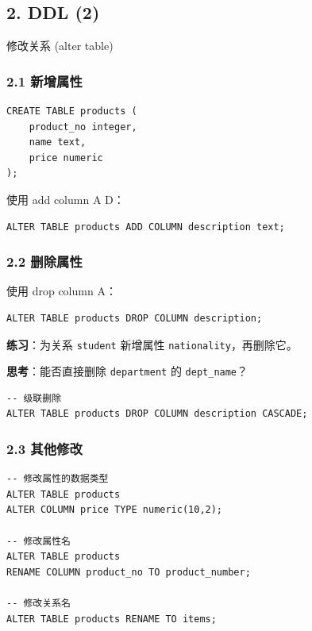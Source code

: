\documentclass[aspectratio=169, 14pt]{beamer}
\begin{document}
\begin{frame}
    \section{\textcolor{darkmidnightblue}{2. DDL (2)}}
修改关系 (\alert{alter table})
\end{frame}

\begin{frame}[fragile]
    \frametitle{2.1 新增属性}

    \begin{verbatim}
CREATE TABLE products (
    product_no integer,
    name text,
    price numeric
);
    \end{verbatim}

使用 \alert{add column A D}：

\begin{verbatim}
ALTER TABLE products ADD COLUMN description text;    
\end{verbatim}

\end{frame}

\begin{frame}[fragile]
    \frametitle{2.2 删除属性}
    使用 \alert{drop column A}：
    \begin{verbatim}
ALTER TABLE products DROP COLUMN description; 
    \end{verbatim}    
    {\large {}}  \textbf{练习}：为关系 \texttt{student} 新增属性 \texttt{nationality}，再删除它。

\pause
{\large {}}  \textbf{思考}：能否直接删除 \texttt{department} 的 \texttt{dept\_name}？

\pause
{}  

\begin{verbatim}
-- 级联删除
ALTER TABLE products DROP COLUMN description CASCADE;
\end{verbatim}  

\end{frame}

\begin{frame}[fragile]
    \frametitle{2.3 其他修改}
    \begin{verbatim}
-- 修改属性的数据类型
ALTER TABLE products 
ALTER COLUMN price TYPE numeric(10,2);

-- 修改属性名
ALTER TABLE products 
RENAME COLUMN product_no TO product_number;

-- 修改关系名
ALTER TABLE products RENAME TO items;
    \end{verbatim}

\end{frame}
\end{document}
